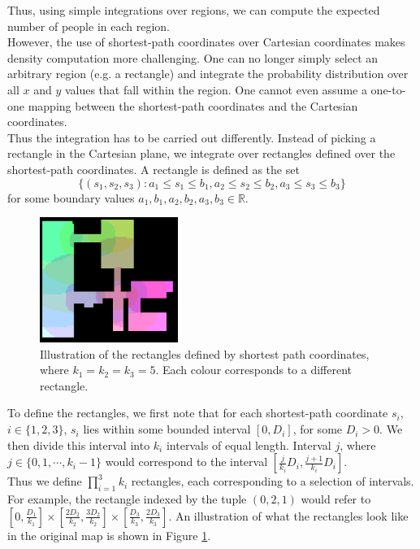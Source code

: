 \documentclass[letterpaper]{article}
\begin{document}
Thus, using simple integrations over regions, we can compute the expected number of people in each region.\\

However, the use of shortest-path coordinates over Cartesian coordinates makes density computation more challenging. One can no longer simply select an arbitrary region (e.g. a rectangle) and integrate the probability distribution over all $x$ and $y$ values that fall within the region. One cannot even assume a one-to-one mapping between the shortest-path coordinates and the Cartesian coordinates. \\

Thus the integration has to be carried out differently. Instead of picking a rectangle in the Cartesian plane, we integrate over rectangles defined over the shortest-path coordinates. A rectangle is defined as the set 
\[\{(s_1,s_2,s_3) : a_1\leq s_1\leq b_1, a_2\leq s_2\leq b_2, a_3\leq s_3\leq b_3\}\]
for some boundary values $a_1,b_1,a_2,b_2,a_3,b_3 \in \mathbb{R}$.\\

\begin{figure}[!h]
  \centering
    \includegraphics[width=170px]{diagrams/sprectangles.png}
  \caption{Illustration of the rectangles defined by shortest path coordinates, where $k_1 = k_2 = k_3 = 5$. Each colour corresponds to a different rectangle.}
  \label{fig:sprectangles}
\end{figure}

To define the rectangles, we first note that for each shortest-path coordinate $s_i$, $i \in \{1,2,3\}$, $s_i$ lies within some bounded interval $[0,D_i]$, for some $D_i > 0$. We then divide this interval into $k_i$ intervals of equal length. Interval $j$, where $j \in \{0,1,\cdots,k_i-1\}$ would correspond to the interval $[\frac{j}{k_i}D_i, \frac{j+1}{k_i}D_i]$.\\

Thus we define $\prod_{i=1}^3 k_i$ rectangles, each corresponding to a selection of intervals. For example, the rectangle indexed by the tuple $(0,2,1)$ would refer to $[0,\frac{D_1}{k_1}]\times [\frac{2D_2}{k_2},\frac{3D_2}{k_2}]\times [\frac{D_3}{k_3},\frac{2D_3}{k_3}]$. An illustration of what the rectangles look like in the original map is shown in Figure \ref{fig:sprectangles}.\\
\end{document}
